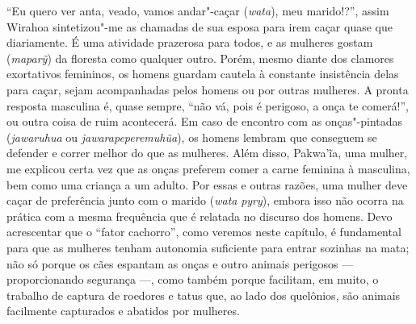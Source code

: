 ``Eu quero ver anta, veado, vamos andar"-caçar (\emph{wata}), meu
marido!?'', assim Wirahoa sintetizou"-me as chamadas de sua esposa para
irem caçar quase que diariamente. É uma atividade prazerosa para todos,
e as mulheres gostam (\emph{maparỹ}) da floresta como qualquer outro.
Porém, mesmo diante dos clamores exortativos femininos, os homens
guardam cautela à constante insistência delas para caçar, sejam
acompanhadas pelos homens ou por outras mulheres. A pronta resposta
masculina é, quase sempre, ``não vá, pois é perigoso, a onça te comerá!'',
ou outra coisa de ruim acontecerá. Em caso de encontro com as
onças"-pintadas (\emph{jawaruhua} ou \emph{jawarapeperemuhũa}), os homens
lembram que conseguem se defender e correr melhor do que as mulheres.
Além disso, Pakwa'ĩa, uma mulher, me explicou certa vez que as onças
preferem comer a carne feminina à masculina, bem como uma criança a um
adulto. Por essas e outras razões, uma mulher deve caçar de preferência
junto com o marido (\emph{wata} \emph{pyry}), embora isso não ocorra na
prática com a mesma frequência que é relatada no discurso dos homens.
Devo acrescentar que o ``fator cachorro'', como veremos neste capítulo, é
fundamental para que as mulheres tenham autonomia suficiente para entrar
sozinhas na mata; não só porque os cães espantam as onças e outro
animais perigosos --- proporcionando segurança ---, como também porque
facilitam, em muito, o trabalho de captura de roedores e tatus que, ao
lado dos quelônios, são animais facilmente capturados e abatidos por
mulheres.

